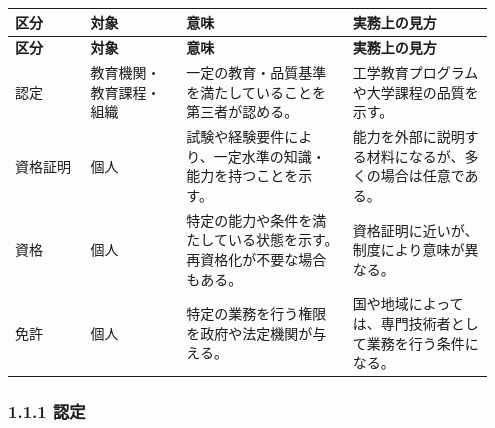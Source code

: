\documentclass[uplatex,dvipdfmx,a4paper,11pt]{jsarticle}
\begin{document}
\begin{center}
\small
\begin{longtable}{p{0.15\linewidth}p{0.19\linewidth}p{0.33\linewidth}p{0.28\linewidth}}
\toprule
\textbf{区分} & \textbf{対象} & \textbf{意味} & \textbf{実務上の見方} \\
\midrule
\endfirsthead
\toprule
\textbf{区分} & \textbf{対象} & \textbf{意味} & \textbf{実務上の見方} \\
\midrule
\endhead
認定 & 教育機関・教育課程・組織 & 一定の教育・品質基準を満たしていることを第三者が認める。 & 工学教育プログラムや大学課程の品質を示す。 \\
\midrule
資格証明 & 個人 & 試験や経験要件により、一定水準の知識・能力を持つことを示す。 & 能力を外部に説明する材料になるが、多くの場合は任意である。 \\
\midrule
資格 & 個人 & 特定の能力や条件を満たしている状態を示す。再資格化が不要な場合もある。 & 資格証明に近いが、制度により意味が異なる。 \\
\midrule
免許 & 個人 & 特定の業務を行う権限を政府や法定機関が与える。 & 国や地域によっては、専門技術者として業務を行う条件になる。 \\
\midrule
\bottomrule
\end{longtable}
\normalsize
\end{center}

\begin{center}
\end{center}

\begin{center}
\end{center}

\subsubsection*{1.1.1 認定}
\end{document}
